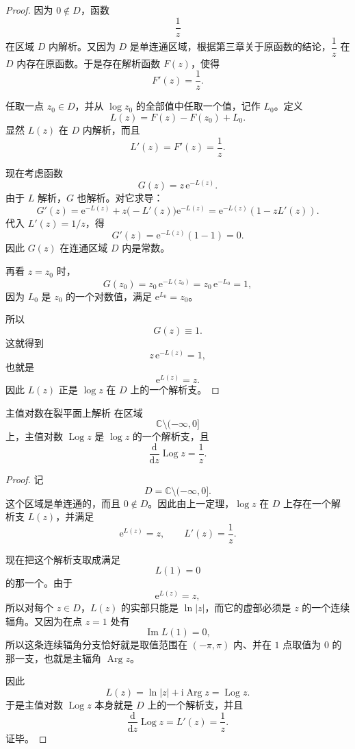 \begin{proof}
因为 $0\notin D$，函数
\[
    \frac{1}{z}
\]
在区域 $D$ 内解析。又因为 $D$ 是单连通区域，根据第三章关于原函数的结论，$\dfrac{1}{z}$ 在 $D$ 内存在原函数。于是存在解析函数 $F(z)$，使得
\[
    F'(z)=\frac{1}{z}.
\]

任取一点 $z_0\in D$，并从 $\log z_0$ 的全部值中任取一个值，记作 $L_0$。定义
\[
    L(z)=F(z)-F(z_0)+L_0.
\]
显然 $L(z)$ 在 $D$ 内解析，而且
\[
    L'(z)=F'(z)=\frac{1}{z}.
\]

现在考虑函数
\[
    G(z)=z\,\mathrm{e}^{-L(z)}.
\]
由于 $L$ 解析，$G$ 也解析。对它求导：
\[
    G'(z)=\mathrm{e}^{-L(z)}+z\bigl(-L'(z)\bigr)\mathrm{e}^{-L(z)}
    =\mathrm{e}^{-L(z)}\left(1-zL'(z)\right).
\]
代入 $L'(z)=1/z$，得
\[
    G'(z)=\mathrm{e}^{-L(z)}(1-1)=0.
\]
因此 $G(z)$ 在连通区域 $D$ 内是常数。

再看 $z=z_0$ 时，
\[
    G(z_0)=z_0\,\mathrm{e}^{-L(z_0)}
    =z_0\,\mathrm{e}^{-L_0}=1,
\]
因为 $L_0$ 是 $z_0$ 的一个对数值，满足 $\mathrm{e}^{L_0}=z_0$。

所以
\[
    G(z)\equiv 1.
\]
这就得到
\[
    z\,\mathrm{e}^{-L(z)}=1,
\]
也就是
\[
    \mathrm{e}^{L(z)}=z.
\]
因此 $L(z)$ 正是 $\log z$ 在 $D$ 上的一个解析支。
\end{proof}

\begin{tuilun}{主值对数在裂平面上解析}{}
在区域
\[
    \mathbb{C}\setminus(-\infty,0]
\]
上，主值对数 $\operatorname{Log} z$ 是 $\log z$ 的一个解析支，且
\[
    \frac{\mathrm{d}}{\mathrm{d}z}\operatorname{Log} z=\frac{1}{z}.
\]
\end{tuilun}

\begin{proof}
记
\[
    D=\mathbb{C}\setminus(-\infty,0].
\]
这个区域是单连通的，而且 $0\notin D$。因此由上一定理，$\log z$ 在 $D$ 上存在一个解析支 $L(z)$，并满足
\[
    \mathrm{e}^{L(z)}=z,
    \qquad
    L'(z)=\frac{1}{z}.
\]

现在把这个解析支取成满足
\[
    L(1)=0
\]
的那一个。由于
\[
    \mathrm{e}^{L(z)}=z,
\]
所以对每个 $z\in D$，$L(z)$ 的实部只能是 $\ln|z|$，而它的虚部必须是 $z$ 的一个连续辐角。又因为在点 $z=1$ 处有
\[
    \operatorname{Im}L(1)=0,
\]
所以这条连续辐角分支恰好就是取值范围在 $(-\pi,\pi)$ 内、并在 $1$ 点取值为 $0$ 的那一支，也就是主辐角 $\operatorname{Arg} z$。

因此
\[
    L(z)=\ln|z|+\mathrm{i}\operatorname{Arg} z=\operatorname{Log} z.
\]
于是主值对数 $\operatorname{Log} z$ 本身就是 $D$ 上的一个解析支，并且
\[
    \frac{\mathrm{d}}{\mathrm{d}z}\operatorname{Log} z
    =
    L'(z)
    =
    \frac{1}{z}.
\]
证毕。
\end{proof}

